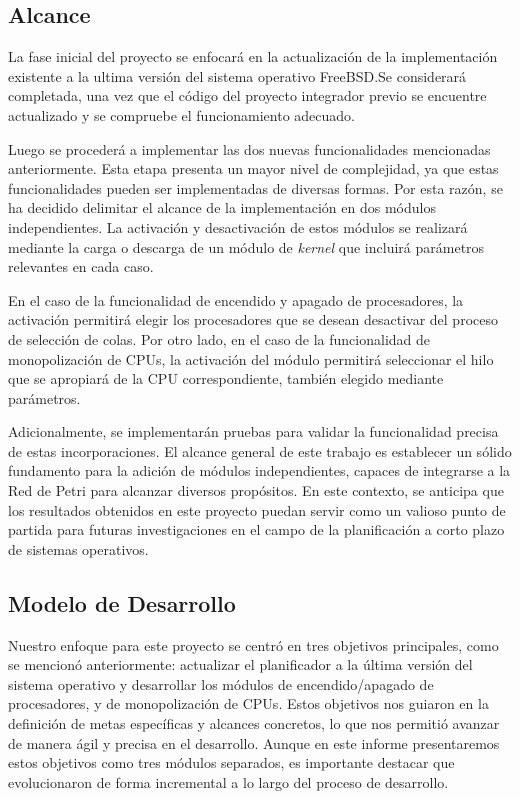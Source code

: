 \subsection{Alcance}

La fase inicial del proyecto se enfocará en la actualización de la implementación existente a la ultima versión del sistema operativo FreeBSD.\@ Se considerará completada, una vez que el código del proyecto integrador previo se encuentre actualizado y se compruebe el funcionamiento adecuado.\par

Luego se procederá a implementar las dos nuevas funcionalidades mencionadas anteriormente. Esta etapa presenta un mayor nivel de complejidad, ya que estas funcionalidades pueden ser implementadas de diversas formas. Por esta razón, se ha decidido delimitar el alcance de la implementación en dos módulos independientes. La activación y desactivación de estos módulos se realizará mediante la carga o descarga de un módulo de \textit{kernel} que incluirá parámetros relevantes en cada caso.\par

En el caso de la funcionalidad de encendido y apagado de procesadores, la activación permitirá elegir los procesadores que se desean desactivar del proceso de selección de colas. Por otro lado, en el caso de la funcionalidad de monopolización de CPUs, la activación del módulo permitirá seleccionar el hilo que se apropiará de la CPU correspondiente, también elegido mediante parámetros.\par

Adicionalmente, se implementarán pruebas para validar la funcionalidad precisa de estas incorporaciones. El alcance general de este trabajo es establecer un sólido fundamento para la adición de módulos independientes, capaces de integrarse a la Red de Petri para alcanzar diversos propósitos. En este contexto, se anticipa que los resultados obtenidos en este proyecto puedan servir como un valioso punto de partida para futuras investigaciones en el campo de la planificación a corto plazo de sistemas operativos.\par

\subsection{Modelo de Desarrollo}

Nuestro enfoque para este proyecto se centró en tres objetivos principales, como se mencionó anteriormente: actualizar el planificador a la última versión del sistema operativo y desarrollar los módulos de encendido/apagado de procesadores, y de monopolización de CPUs. Estos objetivos nos guiaron en la definición de metas específicas y alcances concretos, lo que nos permitió avanzar de manera ágil y precisa en el desarrollo. Aunque en este informe presentaremos estos objetivos como tres módulos separados, es importante destacar que evolucionaron de forma incremental a lo largo del proceso de desarrollo.


